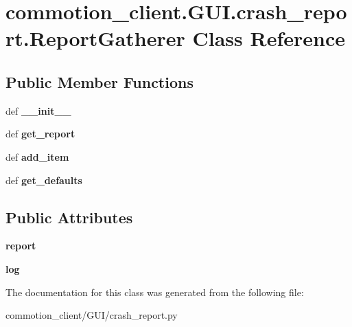 \hypertarget{classcommotion__client_1_1GUI_1_1crash__report_1_1ReportGatherer}{\section{commotion\+\_\+client.\+G\+U\+I.\+crash\+\_\+report.\+Report\+Gatherer Class Reference}
\label{classcommotion__client_1_1GUI_1_1crash__report_1_1ReportGatherer}
}
\subsection*{Public Member Functions}
\begin{DoxyCompactItemize}
\item 
\hypertarget{classcommotion__client_1_1GUI_1_1crash__report_1_1ReportGatherer_a8f8a67b02e968b01536846640e15a329}{def {\bfseries \+\_\+\+\_\+init\+\_\+\+\_\+}}\label{classcommotion__client_1_1GUI_1_1crash__report_1_1ReportGatherer_a8f8a67b02e968b01536846640e15a329}

\item 
\hypertarget{classcommotion__client_1_1GUI_1_1crash__report_1_1ReportGatherer_a8832cfd560db654afe5305d15c525021}{def {\bfseries get\+\_\+report}}\label{classcommotion__client_1_1GUI_1_1crash__report_1_1ReportGatherer_a8832cfd560db654afe5305d15c525021}

\item 
\hypertarget{classcommotion__client_1_1GUI_1_1crash__report_1_1ReportGatherer_aaaccb80d5b2e14dc5c3eadd900fc1635}{def {\bfseries add\+\_\+item}}\label{classcommotion__client_1_1GUI_1_1crash__report_1_1ReportGatherer_aaaccb80d5b2e14dc5c3eadd900fc1635}

\item 
\hypertarget{classcommotion__client_1_1GUI_1_1crash__report_1_1ReportGatherer_a14752ca72ce630765b24c08cfd0ac685}{def {\bfseries get\+\_\+defaults}}\label{classcommotion__client_1_1GUI_1_1crash__report_1_1ReportGatherer_a14752ca72ce630765b24c08cfd0ac685}

\end{DoxyCompactItemize}
\subsection*{Public Attributes}
\begin{DoxyCompactItemize}
\item 
\hypertarget{classcommotion__client_1_1GUI_1_1crash__report_1_1ReportGatherer_ada108101968c0e64bc0280724ab26746}{{\bfseries report}}\label{classcommotion__client_1_1GUI_1_1crash__report_1_1ReportGatherer_ada108101968c0e64bc0280724ab26746}

\item 
\hypertarget{classcommotion__client_1_1GUI_1_1crash__report_1_1ReportGatherer_a67341c89d29bb1bebd477cdfac2e22f7}{{\bfseries log}}\label{classcommotion__client_1_1GUI_1_1crash__report_1_1ReportGatherer_a67341c89d29bb1bebd477cdfac2e22f7}

\end{DoxyCompactItemize}


The documentation for this class was generated from the following file\+:\begin{DoxyCompactItemize}
\item 
commotion\+\_\+client/\+G\+U\+I/crash\+\_\+report.\+py\end{DoxyCompactItemize}
